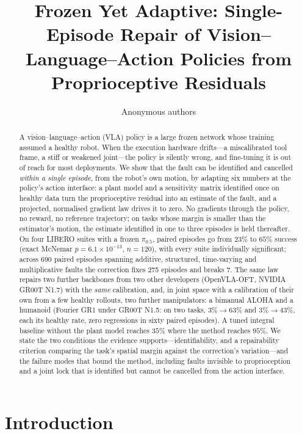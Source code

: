 \documentclass{article}
\title{Frozen Yet Adaptive: Single-Episode Repair of Vision--Language--Action Policies from Proprioceptive Residuals}
\author{Anonymous authors}
\begin{document}
\maketitle

\begin{abstract}
A vision--language--action (VLA) policy is a large frozen network whose training assumed a
healthy robot. When the execution hardware drifts---a miscalibrated tool frame, a stiff or
weakened joint---the policy is silently wrong, and fine-tuning it is out of reach for most
deployments. We show that the fault can be identified and cancelled \emph{within a single
episode}, from the robot's own motion, by adapting six numbers at the policy's action
interface: a plant model and a sensitivity matrix identified once on healthy data turn the
proprioceptive residual into an estimate of the fault, and a projected, normalised gradient
law drives it to zero. No gradients through the policy, no reward, no reference trajectory;
on tasks whose margin is smaller than the estimator's motion, the estimate identified in one
to three episodes is held thereafter. On four LIBERO suites with a frozen $\pi_{0.5}$, paired
episodes go from $23\%$ to $65\%$ success (exact McNemar $p = 6.1\times10^{-13}$, $n=120$),
with every suite individually significant; across 690 paired episodes spanning additive,
structured, time-varying and multiplicative faults the correction fixes 275 episodes and
breaks 7. The same law repairs two further backbones from two other developers (OpenVLA-OFT,
NVIDIA GR00T N1.7) with the \emph{same} calibration, and, in joint space with a calibration
of their own from a few healthy rollouts, two further manipulators: a bimanual ALOHA and a
humanoid (Fourier GR1 under GR00T N1.5: on two tasks, $3\%\to63\%$ and $3\%\to43\%$, each its
healthy rate, zero regressions in sixty paired episodes). A tuned integral
baseline without the plant model reaches $35\%$ where the method reaches $95\%$. We state the
two conditions the evidence supports---identifiability, and a repairability criterion
comparing the task's spatial margin against the correction's variation---and the failure
modes that bound the method, including faults invisible to proprioception and a joint lock
that is identified but cannot be cancelled from the action interface.
\end{abstract}

\section{Introduction}
\end{document}
